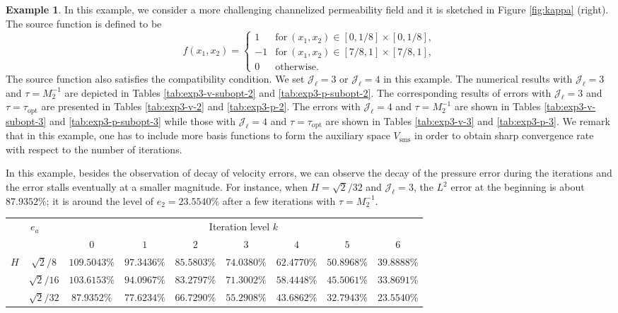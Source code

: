 \documentclass{article}[11pt]
\theoremstyle{definition}
\newtheorem{exmp}{Example}[section]
\begin{document}
\begin{exmp} \label{exp3}
In this example, we consider a more challenging channelized permeability field and it is sketched in Figure \ref{fig:kappa} (right). The source function is defined to be 
$$ f(x_1, x_2) = \left \{ \begin{array}{cl}
1 & \text{for} ~ (x_1, x_2) \in [0, 1/8] \times [0, 1/8], \\
-1 & \text{for} ~ (x_1, x_2) \in [7/8, 1] \times [7/8, 1], \\
0 & \text{otherwise}.
\end{array} \right . $$
The source function also satisfies the compatibility condition. We set $\mathcal{J}_{\ell} = 3$ or $\mathcal{J}_{\ell} = 4$ in this example. 
The numerical results with $\mathcal{J}_{\ell} = 3$ and $\tau = M_2^{-1}$ are depicted in Tables \ref{tab:exp3-v-subopt-2} and \ref{tab:exp3-p-subopt-2}. 
The corresponding results of errors with $\mathcal{J}_{\ell} = 3$ and $\tau = \tau_{\text{opt}}$ are presented in Tables \ref{tab:exp3-v-2} and \ref{tab:exp3-p-2}. 
The errors with $\mathcal{J}_{\ell} = 4$ and $\tau = M_2^{-1}$ are shown in Tables \ref{tab:exp3-v-subopt-3} and \ref{tab:exp3-p-subopt-3} while 
those with $\mathcal{J}_{\ell} = 4$ and $\tau = \tau_{\text{opt}}$ are shown in Tables \ref{tab:exp3-v-3} and \ref{tab:exp3-p-3}. 
We remark that in this example, one has to include more basis functions to form the auxiliary space $V_{\text{sms}}$ in order to obtain sharp convergence rate with respect to the number of iterations. 

In this example, besides the observation of decay of velocity errors, we can observe the decay of the pressure error during the iterations and the error stalls eventually at a smaller magnitude. For instance, when $H = \sqrt{2}/32$ and $\mathcal{J}_{\ell} = 3$, the $L^2$ error at the beginning is about $87.9352\%$; it is around the level of $e_2 = 23.5540\%$ after a few iterations with $\tau = M_2^{-1}$. 

\begin{table}[ht]
\centering
\begin{tabular}{cc||ccccccc}
\hline
\multicolumn{2}{c||}{\multirow{2}{*}{$e_a$}}   & \multicolumn{7}{c}{Iteration level $k$}           \\ \cline{3-9} 
\multicolumn{2}{c||}{} &   $0$ & $1$   & $2$   & $3$   & $4$   &$5$ & $6$ \\ 
\hline \hline
\multicolumn{1}{c|}{\multirow{3}{*}{$H$}} & 
$\sqrt{2}/8$ & $109.5043\%$ & $97.3436\%$ & $85.5803\%$ & $74.0380\%$ & $62.4770\%$ & $50.8968\%$ & $39.8888\%$ \\
\multicolumn{1}{c|}{} &  
 $\sqrt{2}/16$ & $103.6153\%$ & $94.0967\%$ & $83.2797\%$ & $71.3002\%$ & $58.4448\%$ & $45.5061\%$ & $33.8691\%$ \\
\multicolumn{1}{c|}{} &  
 $\sqrt{2}/32$ & $87.9352\%$ & $77.6234\%$ & $66.7290\%$ & $55.2908\%$ & $43.6862\%$ & $32.7943\%$ & $23.5540\%$ \\


\end{tabular}
\end{table}
\end{exmp}
\end{document}
